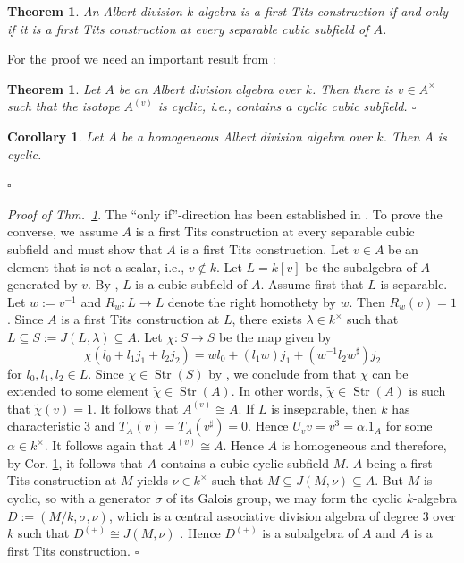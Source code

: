\documentclass{amsart}
\def\lz{\par \vspace{8pt}}
\newtheorem{thm}[equation]{Theorem}
\newtheorem{cor}[equation]{Corollary}
\theoremstyle{definition} %
\theoremstyle{remark} %
\DeclareMathOperator{\Str}{Str}
\renewcommand{\:}{\colon\,}
\numberwithin{equation}{section}
\begin{document}
\begin{thm} \label{embed}
An Albert division $k$-algebra is a first Tits construction if and only if it is a first Tits construction at every separable cubic subfield of $A$.    
\end{thm}
For the proof we need an important result from \cite{MR4242148}:
\begin{thm} \label{t.CYCIST} Let $A$ be an Albert division algebra over %
$k$. Then there is $v\in A^\times$ such that the isotope $A^{(v)}$ is \emph{cyclic}, i.e., contains a cyclic cubic  subfield. \hfill $\square$
\end{thm}
\begin{cor}\label{embed-cor} Let $A$ be a homogeneous Albert division algebra over $k$. Then $A$ is cyclic. 

\hfill $\square$
\end{cor}

\noindent \emph{Proof of Thm.~\ref{embed}}. The ``only if''-direction has been established in \cite[Cor.~4.5]{MR734841}. To prove the converse, we assume $A$ is a first Tits construction at every separable cubic subfield and must show that $A$ is a first Tits construction. Let $v\in A$ be an element that is not a scalar, i.e., $v\notin k$. Let $L=k[v]$ be the subalgebra of $A$ generated by $v$. By \cite[Prop.~46.6]{MR4806163}, $L$ is a cubic subfield of $A$. Assume first that $L$ is separable. Let $w:=v^{-1}$ and $R_w:L\rightarrow L$ denote the right homothety by $w$. Then $R_w(v)=1$. Since $A$ is a first Tits construction at $L$, there exists $\lambda\in k^\times$ such that $L \subseteq S := J(L,\lambda)\subseteq A$. Let $\chi:S\rightarrow S$ be the map given by  
\[
\chi(l_0 + l_1j_1 + l_2j_2) = wl_0 + (l_1w)j_1 + (w^{-1}l_2w^\sharp)j_2
\]
for $l_0, l_1, l_2\in L$. Since $\chi\in \Str(S)$ by \cite[Exc.~42.25]{MR4806163}, we conclude from \cite[Thm.~4.4]{MR4009439} that $\chi$ can be extended to  some element $\widetilde{\chi} \in \Str(A)$. In other words, $\widetilde{\chi}\in \Str(A)$ is such that $\widetilde{\chi}(v)=1$. It follows that $A^{(v)}\cong A$. If $L$ is inseparable, then $k$ has characteristic $3$ and $T_A(v)=T_A(v^\sharp)=0$. Hence $U_vv = v^3=\alpha.1_A$ for some $\alpha\in k^\times$. It follows again that $A^{(v)}\cong A$. Hence $A$ is homogeneous and therefore, by Cor. \ref{embed-cor}, it follows that $A$ contains a cubic cyclic subfield $M$. $A$ being a first Tits construction at $M$ yields $\nu\in k^\times$ such that $M \subseteq J(M,\nu)\subseteq A$. But $M$ is cyclic, so with a generator $\sigma$ of its Galois group, we may form the cyclic $k$-algebra $D := (M/k,\sigma,\nu)$, which is a central associative division algebra of degree $3$ over $k$ such that $D^{(+)} \cong J(M,\nu)$ \cite[Prop.~5.1]{MR87h:17038b}. Hence $D^{(+)}$ is a subalgebra of $A$ and $A$ is a first Tits construction. \hfill $\square$ \lz
\end{document}

